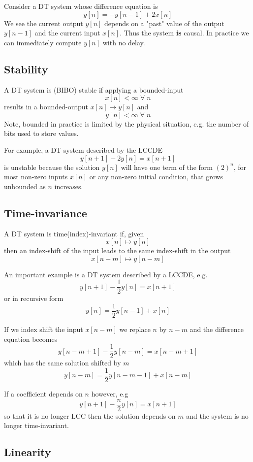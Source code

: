 \begin{example}
Consider a DT system whose difference equation is
\[
y[n] = -y[n-1] + 2x[n]
\]
We see the current output $y[n]$ depends on a "past" value of the output $y[n-1]$ and the current input $x[n]$. Thus the system \textbf{is} causal. In practice we can immediately compute $y[n]$ with no delay. 
\end{example}

\subsection{Stability}

A DT system is (BIBO) stable if applying a bounded-input
\[
x[n] < \infty \; \forall \; n
\]
results in a bounded-output $x[n] \mapsto y[n]$ and 
\[
y[n] < \infty \; \forall \; n
\]
Note, bounded in practice is limited by the physical situation, e.g. the number of bits used to store values.

For example, a DT system described by the LCCDE
\[
y[n+1] - 2 y[n] = x[n+1]
\]
is unstable because the solution $y[n]$ will have one term of the form $\left( 2\right)^n$, for most non-zero inputs $x[n]$ or any non-zero initial condition, that grows unbounded as $n$ increases.

\subsection{Time-invariance}
A DT system is time(index)-invariant if, given
\[
x[n] \mapsto y[n]
\]
then an index-shift of the input leads to the same index-shift in the output
\[
x[n-m] \mapsto y[n-m]
\]

An important example is a DT system described by a LCCDE, e.g.
\[
y[n+1] - \frac{1}{2} y[n] = x[n+1]
\]
or in recursive form
\[
y[n] = \frac{1}{2} y[n-1] + x[n]
\]

If we index shift the input $x[n - m]$ we replace $n$ by $n-m$ and the difference equation becomes
\[
y[n-m+1] - \frac{1}{2} y[n-m] = x[n-m+1]
\]
which has the same solution shifted by $m$
\[
y[n-m] = \frac{1}{2} y[n-m -1] + x[n-m]
\]

If a coefficient depends on $n$ however, e.g
\[
y[n+1] - \frac{n}{2} y[n] = x[n+1]
\]
so that it is no longer LCC then the solution depends on $m$ and the system is no longer time-invariant.

\subsection{Linearity}

